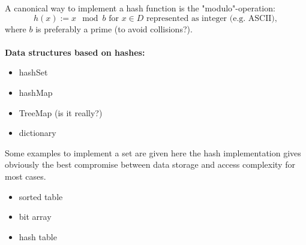 \documentclass[]{article}
\begin{document}
A canonical way to implement a hash function is the "modulo"-operation:
\[
h(x):= x \mod b \text{ for } x \in D \text{ represented as integer (e.g. ASCII)},
\]
where $b$ is preferably a prime (to avoid collisions?).\\ \\

\textbf{Data structures based on hashes:}
\begin{itemize}
\item hashSet
\item hashMap
\item TreeMap (is it really?)
\item dictionary
\end{itemize}

Some examples to implement a set are given here the hash implementation gives obviously the best compromise between data storage and access complexity for most cases.
\begin{itemize}
\item sorted table
\item bit array
\item hash table
\end{itemize}
\end{document}
